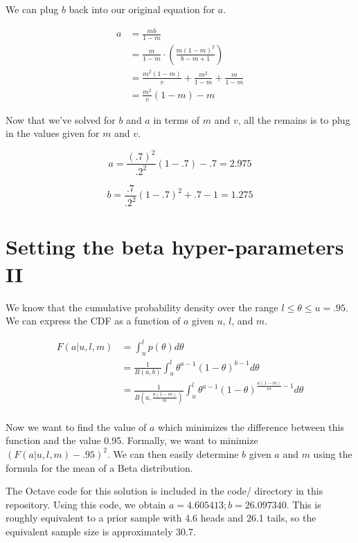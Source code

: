 \documentclass{article}
\begin{document}
We can plug $b$ back into our original equation for $a$.

\begin{align*}
  a &= \frac{mb}{1-m} \\
    &= \frac{m}{1-m} \cdot \left( \frac{m(1 - m)^2}{b - m + 1} \right)
  \\
    &= \frac{m^2(1-m)}{v} + \frac{m^2}{1-m} + \frac{m}{1-m} \\
    &= \frac{m^2}{v}(1-m) - m
\end{align*}

Now that we've solved for $b$ and $a$ in terms of $m$ and $v$, all the
remains is to plug in the values given for $m$ and $v$.

\begin{equation*}
  a = \frac{(.7)^2}{.2^2}(1 - .7) - .7 = 2.975
\end{equation*}

\begin{equation*}
  b = \frac{.7}{.2^2}(1 - .7)^2 + .7 - 1 = 1.275
\end{equation*}

\section{Setting the beta hyper-parameters II}

We know that the cumulative probability density over the range
$l \le \theta \le u = .95$. We can express the CDF as a function of
$a$ given $u$, $l$, and $m$.

\begin{align*}
  F(a|u,l,m) &= \int_u^l p(\theta) d\theta \\
             &= \frac{1}{B(a,b)} \int_u^l \theta^{a-1}(1-\theta)^{b-1}
               d\theta \\
             &= \frac{1}{B(a,\frac{a(1-m)}{m})} \int_u^l \theta^{a-1}(1-\theta)^{\frac{a(1-m)}{m}-1}
               d\theta \\
\end{align*}

Now we want to find the value of $a$ which minimizes the difference
between this function and the value 0.95. Formally, we want to
minimize $(F(a|u,l,m) - .95)^2$. We can then easily determine $b$
given $a$ and $m$ using the formula for the mean of a Beta
distribution.

The Octave code for this solution is included in the code/ directory
in this repository. Using this code, we obtain
$a = 4.605413; b = 26.097340$. This is roughly equivalent to a prior
sample with 4.6 heads and 26.1 tails, so the equivalent sample size is
approximately 30.7.
\end{document}

